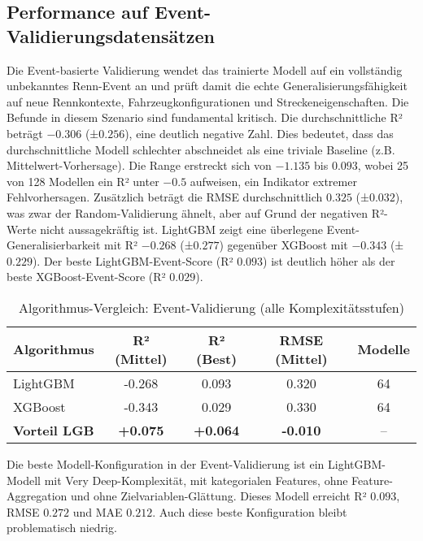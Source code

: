 \subsection{Performance auf Event-Validierungsdatensätzen}

Die Event-basierte Validierung wendet das trainierte Modell auf ein vollständig unbekanntes Renn-Event an und prüft damit die echte Generalisierungsfähigkeit auf neue Rennkontexte, Fahrzeugkonfigurationen und Streckeneigenschaften. Die Befunde in diesem Szenario sind fundamental kritisch. Die durchschnittliche R² beträgt $-0.306$ (±$0.256$), eine deutlich negative Zahl. Dies bedeutet, dass das durchschnittliche Modell schlechter abschneidet als eine triviale Baseline (z.B. Mittelwert-Vorhersage). Die Range erstreckt sich von $-1.135$ bis $0.093$, wobei 25 von 128 Modellen ein R² unter $-0.5$ aufweisen, ein Indikator extremer Fehlvorhersagen. Zusätzlich beträgt die RMSE durchschnittlich $0.325$ (±$0.032$), was zwar der Random-Validierung ähnelt, aber auf Grund der negativen R²-Werte nicht aussagekräftig ist. LightGBM zeigt eine überlegene Event-Generalisierbarkeit mit R² $-0.268$ (±$0.277$) gegenüber XGBoost mit $-0.343$ (±$0.229$). Der beste LightGBM-Event-Score (R² $0.093$) ist deutlich höher als der beste XGBoost-Event-Score (R² $0.029$).

\begin{table}[H]
  \centering
  \begin{tabular}{lcccc}
    \toprule
    \textbf{Algorithmus} & \textbf{R² (Mittel)} & \textbf{R² (Best)} & \textbf{RMSE (Mittel)} & \textbf{Modelle} \\
    \midrule
    LightGBM & -0.268 & 0.093 & 0.320 & 64 \\
    XGBoost & -0.343 & 0.029 & 0.330 & 64 \\
    \midrule
    \textbf{Vorteil LGB} & \textbf{+0.075} & \textbf{+0.064} & \textbf{-0.010} & -- \\
    \bottomrule
  \end{tabular}
  \caption{Algorithmus-Vergleich: Event-Validierung (alle Komplexitätsstufen)}
  \label{tab:algo_event}
\end{table}

Die beste Modell-Konfiguration in der Event-Validierung ist ein LightGBM-Modell mit Very Deep-Komplexität, mit kategorialen Features, ohne Feature-Aggregation und ohne Zielvariablen-Glättung. Dieses Modell erreicht R² $0.093$, RMSE $0.272$ und MAE $0.212$. Auch diese beste Konfiguration bleibt problematisch niedrig.

